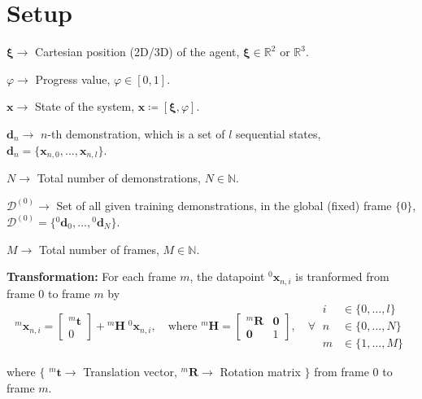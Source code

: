 \section*{Setup}

\( \boldsymbol{\xi} \to \) Cartesian position (2D/3D) of the agent, \( \boldsymbol{\xi} \in \mathbb{R}^2 \) or \( \mathbb{R}^3 \).

\( \varphi \to \) Progress value, \( \varphi \in [0, 1] \).

\( \boldsymbol{x} \to \) State of the system, \( \boldsymbol{x} \coloneq [\boldsymbol{\xi}, \varphi] \).

\( \boldsymbol{d}_n \to \) \( n \)-th demonstration, which is a set of \( l \) sequential states, \( \boldsymbol{d}_n = \{ \boldsymbol{x}_{n, 0}, \ldots, \boldsymbol{x}_{n, l} \} \).

\( N \to \) Total number of demonstrations, \( N \in \mathbb{N} \).

\( \mathcal{D}^{(0)} \to \) Set of all given training demonstrations, in the global (fixed) frame \( \{ 0 \} \), \( \mathcal{D}^{(0)} = \{ {}^{0}\boldsymbol{d}_0, \ldots, {}^{0}\boldsymbol{d}_N \} \).

\( M \to \) Total number of frames, \( M \in \mathbb{N} \).

\textbf{Transformation:}
For each frame \( m \), the datapoint \( {}^{0}\boldsymbol{x}_{n, i} \) is tranformed from frame \( 0 \) to frame \( m \) by
\begin{equation}
    {}^{m}\boldsymbol{x}_{n, i}
    =
    \begin{bmatrix}
        {}^{m}\boldsymbol{t} \\
        0
    \end{bmatrix}
    +
    {}^{m}\boldsymbol{H} \; {}^{0}\boldsymbol{x}_{n, i}
    , \quad
    \text{where }
    {}^{m}\boldsymbol{H}
    =
    \begin{bmatrix}
        {}^{m}\boldsymbol{R} & \boldsymbol{0} \\
        \boldsymbol{0}       & 1
    \end{bmatrix}
    , \quad \forall \
    \begin{aligned}
        i & \in \{ 0, \ldots, l \} \\
        n & \in \{ 0, \ldots, N \} \\
        m & \in \{ 1, \ldots, M \}
    \end{aligned}
\end{equation}

where \( \big \{ \)
\( {}^{m}\boldsymbol{t} \to \) Translation vector, \( {}^{m}\boldsymbol{R} \to \) Rotation matrix \( \big \} \) from frame \( 0 \) to frame \( m \).

